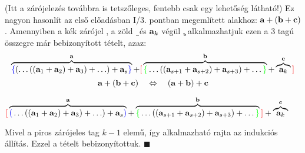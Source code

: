 \documentclass[a4paper,11.5pt]{article}
\begin{document}
\begin{theorem}
		\noindent (Itt a zárójelezés továbbra is tetszőleges, fentebb csak egy lehetőség látható!) Ez nagyon hasonlít az első előadásban I/3. pontban megemlített alakhoz: $\textbf{a}+(\textbf{b}+\textbf{c})$. Amennyiben a kék zárójel \a, a zöld \b\ és $\textbf{a}_k$ végül \c, alkalmazhatjuk ezen a 3 tagú összegre már bebizonyított tételt, azaz:
		$$ \overbrace{\textcolor{blue}{\{}
		(\ldots((\textbf{a}_1+\textbf{a}_2)+\textbf{a}_3)+\ldots)+\textbf{a}_s\textcolor{blue}{\}}}^{\textbf{a}}+ \textcolor{red}{[}\overbrace{\textcolor{green}{\{}\ldots((\textbf{a}_{s+1}+\textbf{a}_{s+2})+\textbf{a}_{s+3})+\ldots\textcolor{green}{\}}}^{\textbf{b}}+\overbrace{\textbf{a}_{k}}^{\textbf{c}}\textcolor{red}{]}$$
		\[ \textbf{a}+(\textbf{b}+\textbf{c})\quad \Leftrightarrow\quad (\textbf{a}+\textbf{b})+\textbf{c} \]
		\begin{center}
			$ \textcolor{red}{[}
			\overbrace{\textcolor{blue}{(}\ldots((\textbf{a}_1+\textbf{a}_2)+\textbf{a}_3)+\ldots)+\textbf{a}_s\textcolor{blue}{)}}^{\textbf{a}}+ \overbrace{\textcolor{green}{\{}\ldots((\textbf{a}_{s+1}+\textbf{a}_{s+2})+\textbf{a}_{s+3})+\ldots\textcolor{green}{\}}}^{\textbf{b}}\textcolor{red}{]}+\overbrace{\textbf{a}_{k}}^{\textbf{c}}$
		\end{center}
		
		\noindent Mivel a piros zárójeles tag $k-1$ elemű, így alkalmazható rajta az indukciós állítás. Ezzel a tételt bebizonyítottuk. $\blacksquare$
	\end{theorem}
	
\end{document}
